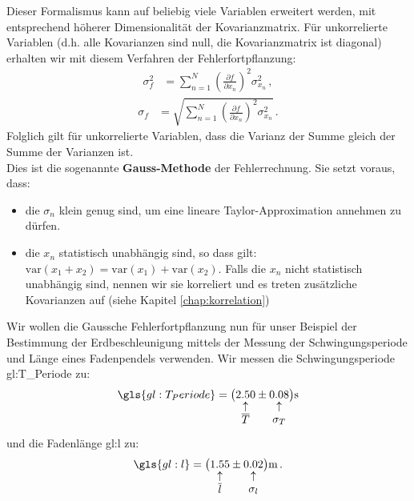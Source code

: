 Dieser Formalismus kann auf beliebig viele Variablen erweitert werden, mit entsprechend höherer Dimensionalität der Kovarianzmatrix. Für unkorrelierte Variablen (d.h. alle Kovarianzen sind null, die Kovarianzmatrix ist diagonal) erhalten wir mit diesem Verfahren der Fehlerfortpflanzung:
\begin{align}
\sigma^2_f &= \sum^N_{n=1} \left( \frac{\partial f}{\partial x_n} \right)^2 \sigma^2_{x_n}\,,
\label{eq:GaussnD}
\end{align}
\begin{align}
\sigma_f &= \sqrt{ \sum^N_{n=1} \left( \frac{\partial f}{\partial x_n} \right)^2 \sigma^2_{x_n}}\,.
\label{eq:vl3-4}
\end{align}
Folglich gilt für unkorrelierte Variablen, dass die Varianz der Summe gleich der Summe der Varianzen ist.\\

Dies ist die sogenannte \textbf{Gauss-Methode} der Fehlerrechnung. Sie setzt voraus, dass:
\begin{itemize}
    \setlength\itemsep{0em}
        \item die $\sigma_n$ klein genug sind, um eine lineare Taylor-Approximation annehmen zu dürfen.
        \item die $x_n$ statistisch unabhängig sind, so dass gilt: $\text{var} ( x_1 + x_2 ) = \text{var} ( x_1 ) + \text{var} ( x_2 )$. Falls die $x_n$ nicht statistisch unabhängig sind, nennen wir sie korreliert und es treten zusätzliche Kovarianzen auf (siehe Kapitel \ref{chap:korrelation}) 
\end{itemize}

Wir wollen die Gaussche Fehlerfortpflanzung nun für unser Beispiel der Bestimmung der Erdbeschleunigung mittels der Messung der Schwingungsperiode  und Länge eines Fadenpendels verwenden. Wir messen die Schwingungsperiode \gls{gl:T_Periode}  zu:
\begin{align*}
\gls{gl:T_Periode} = \bigl( \underarrow[\text{2.50}][\uparrow]{\text{$\overline{T}$}} \pm \underarrow[\text{0.08}][\uparrow]{\text{$\sigma_T$}} \bigr) \text{s}
\end{align*}
und die Fadenlänge \gls{gl:l}  zu:
\begin{align*}
\gls{gl:l} = \bigl( \underarrow[\text{1.55}][\uparrow]{\text{$\overline{l}$}} \pm \underarrow[\text{0.02}][\uparrow]{\text{$\sigma_l$}} \bigr) \text{m}\,.
\end{align*}

